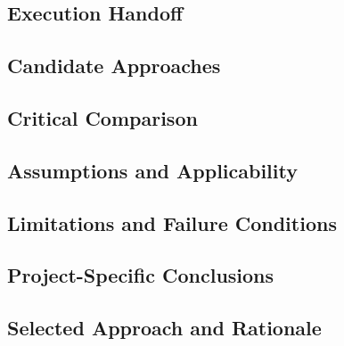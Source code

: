 
\subsection{Execution Handoff}
\label{sec:res-ver-tst-execution-handoff}


\subsection{Candidate Approaches}
\label{sec:res-ver-tst-candidate-approaches}


\subsection{Critical Comparison}
\label{sec:res-ver-tst-critical-comparison}


\subsection{Assumptions and Applicability}
\label{sec:res-ver-tst-assumptions}


\subsection{Limitations and Failure Conditions}
\label{sec:res-ver-tst-limitations}


\subsection{Project-Specific Conclusions}
\label{sec:res-ver-tst-conclusions}


\subsection{Selected Approach and Rationale}
\label{sec:res-ver-tst-selected-approach}

